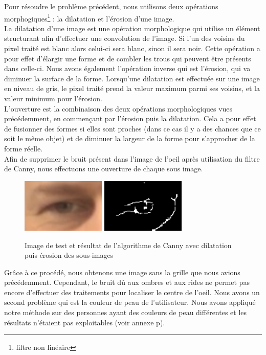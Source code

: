 Pour résoudre le problème précédent, nous utilisons deux opérations morphogiques\footnote{filtre non linéaire} :
la dilatation et l'érosion d'une image.\\

La dilatation d'une image est une opération morphologique qui utilise 
un élément structurant afin d'effectuer une convolution de l'image. Si l'un des voisins du pixel traité
est blanc alors celui-ci sera blanc, sinon il sera noir.
Cette opération a pour effet d'élargir une forme et de combler les trous qui peuvent être présents
dans celle-ci. Nous avons également l'opération inverse qui est l'érosion, qui va diminuer la surface de la forme.
Lorsqu'une dilatation est effectuée sur une image en niveau de gris, le pixel traité prend la valeur maximum parmi
ses voisins, et la valeur minimum pour l'érosion.\\

L'ouverture est la combinaison des deux opérations morphologiques vues précédemment, en commençant par 
l'érosion puis la dilatation. Cela a pour effet de fusionner des formes si elles sont proches (dans ce
cas il y a des chances que ce soit le même objet) et de diminuer la largeur de la forme pour 
s'approcher de la forme réelle.\\ 

Afin de supprimer le bruit présent dans l'image de l'oeil après utilisation du filtre de Canny, nous effectuons une ouverture
de chaque sous image.

\begin{figure}[H]
 \center
 \includegraphics[width=4cm]{image/original.png}
 \includegraphics[width=4cm]{image/canny_final.png}
 \caption{Image de test et résultat de l'algorithme de Canny avec dilatation puis érosion des sous-images}
\end{figure}

Grâce à ce procédé, nous obtenons une image sans la grille que nous avions précédemment. Cependant,
le bruit dû aux ombres et aux rides ne permet pas encore d'effectuer des traitements pour localiser le centre de l'oeil.
Nous avons un second problème qui est la couleur de peau de l'utilisateur. Nous avons appliqué notre méthode 
sur des personnes ayant des couleurs de peau différentes et les résultats n'étaient pas exploitables (voir annexe p\pageref{resultCanny}).\\ 

